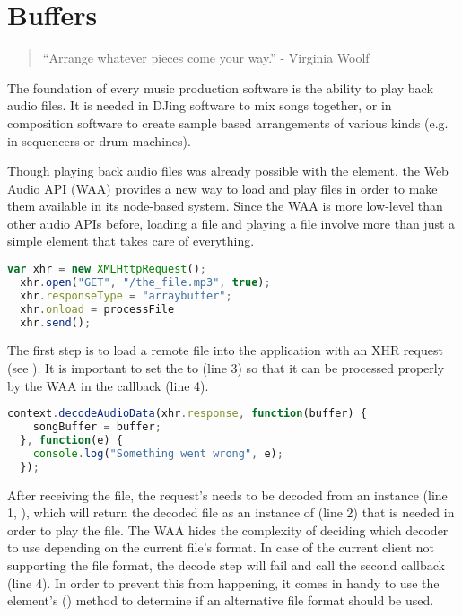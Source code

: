 \section{Buffers}
\label{sec:webaudio-buffer}

\begin{quote}
  ``Arrange whatever pieces come your way.'' -
  Virginia Woolf
\end{quote}

The foundation of every music production software is the ability to play back audio files. It is needed in DJing software to mix songs together, or in composition software to create sample based arrangements of various kinds (e.g. in sequencers or drum machines).

Though playing back audio files was already possible with the  element, the Web Audio API (WAA) provides a new way to load and play files in order to make them available in its node-based system. Since the WAA is more low-level than other audio APIs before, loading a file and playing a file involve more than just a simple  element that takes care of everything. 

\begin{lstlisting}[language=JavaScript, caption=Fetching an audio file from the server, label=lst:xhr-audio]
  var xhr = new XMLHttpRequest();
  xhr.open("GET", "/the_file.mp3", true);
  xhr.responseType = "arraybuffer";
  xhr.onload = processFile
  xhr.send();
\end{lstlisting}

The first step is to load a remote file into the application with an XHR request (see ). It is important to set the  to  (line 3) so that it can be processed properly by the WAA in the  callback (line 4).

\begin{lstlisting}[language=JavaScript, caption=Decoding the audio file, label=lst:processFile]
  context.decodeAudioData(xhr.response, function(buffer) {
    songBuffer = buffer;
  }, function(e) {
    console.log("Something went wrong", e);
  });
\end{lstlisting}

After receiving the file, the request's  needs to be decoded from an  instance (line 1, ), which will return the decoded file as an instance of  (line 2) that is needed in order to play the file. The WAA hides the complexity of deciding which decoder to use depending on the current file's format. In case of the current client not supporting the file format, the decode step will fail and call the second callback (line 4). In order to prevent this from happening, it comes in handy to use the  element's  (\cite[MIME types]{w32014html5}) method to determine if an alternative file format should be used.

